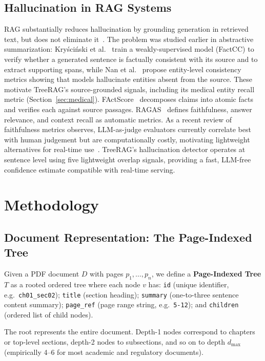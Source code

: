 \documentclass[sigconf,review,anonymous]{acmart}
\begin{document}
\subsection{Hallucination in RAG Systems}
RAG substantially reduces hallucination by grounding generation in retrieved
text, but does not eliminate it~\cite{shuster2021retrieval}. The problem was
studied earlier in abstractive summarization: Kry\'sci\'nski et
al.~\cite{kryscinski2020factcc} train a weakly-supervised model (FactCC) to
verify whether a generated sentence is factually consistent with its source and
to extract supporting spans, while Nan et al.~\cite{nan2021entity} propose
entity-level consistency metrics showing that models hallucinate entities absent
from the source. These motivate TreeRAG's source-grounded signals, including its
medical entity recall metric (Section~\ref{sec:medical}).
FActScore~\cite{min2023factscore} decomposes claims into atomic facts and
verifies each against source passages. RAGAS~\cite{es2023ragas} defines
faithfulness, answer relevance, and context recall as automatic metrics. As a
recent review of faithfulness metrics observes, LLM-as-judge evaluators
currently correlate best with human judgement but are computationally costly,
motivating lightweight alternatives for real-time use~\cite{malin2025review}.
TreeRAG's hallucination detector operates at sentence level using five
lightweight overlap signals, providing a fast, LLM-free confidence estimate
compatible with real-time serving.

\section{Methodology}
\label{sec:method}

\subsection{Document Representation: The Page-Indexed Tree}
Given a PDF document $D$ with pages $p_1,\dots,p_n$, we define a
\textbf{Page-Indexed Tree} $T$ as a rooted ordered tree where each node $v$ has:
\texttt{id} (unique identifier, e.g.\ \texttt{ch01\_sec02}); \texttt{title}
(section heading); \texttt{summary} (one-to-three sentence content summary);
\texttt{page\_ref} (page range string, e.g.\ \texttt{5-12}); and
\texttt{children} (ordered list of child nodes).

The root represents the entire document. Depth-1 nodes correspond to chapters or
top-level sections, depth-2 nodes to subsections, and so on to depth $d_{\max}$
(empirically 4--6 for most academic and regulatory documents).
\end{document}
